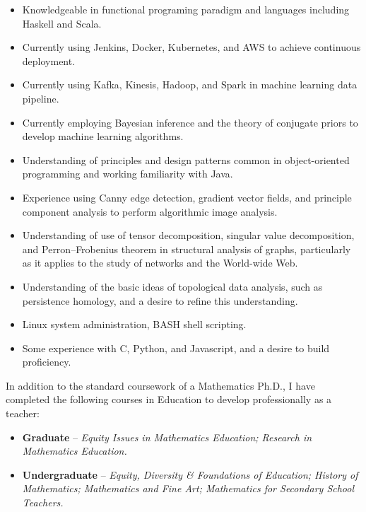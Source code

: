 \documentclass[11pt]{article}
\begin{document}
  \begin{itemize}
    \item{}
      Knowledgeable in functional programing paradigm and languages
      including Haskell and Scala.
    \item{}
      Currently using Jenkins, Docker, Kubernetes, and AWS to achieve
      continuous deployment.
    \item{}
      Currently using Kafka, Kinesis, Hadoop, and Spark in machine learning
      data pipeline.
    \item{}
      Currently employing Bayesian inference and the theory of conjugate
      priors to develop machine learning algorithms.
    \item{}
      Understanding of principles and design patterns common in object-oriented
      programming and working familiarity with Java.
    \item{}
      Experience using Canny edge detection, gradient vector
      fields, and principle component analysis to perform
      algorithmic image analysis.
    \item{}
      Understanding of use of tensor decomposition, singular value
      decomposition, and Perron–Frobenius theorem in structural analysis
      of graphs, particularly as it applies to the study of
      networks and the World-wide Web.
    \item{}
      Understanding of the basic ideas of topological data analysis,
      such as persistence homology, and a desire to refine
      this understanding.
    \item{}
      Linux system administration, BASH shell scripting.
    \item{}
      Some experience with C, Python, and Javascript, and a desire
      to build proficiency.
  \end{itemize}

\newpage

  In addition to the standard coursework of a Mathematics Ph.D., I have
  completed the following courses in Education to develop professionally
  as a teacher:
  \begin{itemize}
    \item{}
      {\bf Graduate} -- {\em Equity Issues in Mathematics Education;
      Research in Mathematics Education.}
    \item{}
      {\bf Undergraduate} -- {\em Equity, Diversity \& Foundations of
        Education; History of Mathematics; Mathematics and Fine Art;
        Mathematics for Secondary School Teachers.}
  \end{itemize}
\end{document}
